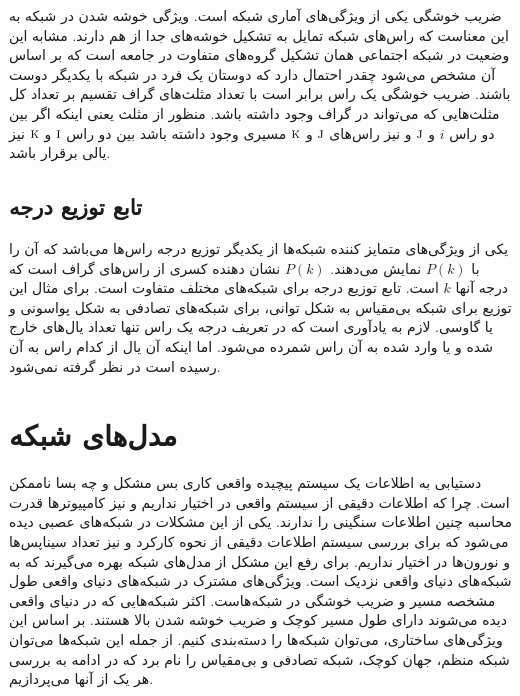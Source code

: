  
ضریب خوشگی یکی از ویژگی‌های آماری شبکه است. ویژگی خوشه شدن در شبکه به این معناست که راس‌های شبکه تمایل به تشکیل خوشه‌های جدا از هم دارند. مشابه این وضعیت در شبکه اجتماعی همان تشکیل گروه‌های متفاوت در جامعه است که بر اساس آن مشخص می‌شود چقدر احتمال دارد که دوستان یک فرد در شبکه با یکدیگر دوست باشند. ضریب خوشگی یک راس برابر است با تعداد مثلث‌های گراف تقسیم بر تعداد کل مثلث‌هایی که می‌تواند در گراف وجود داشته باشد. منظور از مثلث یعنی اینکه اگر بین دو راس $i$ و $\textsc{j}$ و نیز راس‌های $\textsc{j}$ و $\textsc{k}$ مسیری وجود داشته باشد بین دو راس $\textsc{i}$ و $\textsc{k}$ نیز یالی برقرار باشد.
\subsection{تابع توزیع درجه}
یکی از ویژگی‌های  متمایز کننده شبکه‌ها از یکدیگر توزیع درجه‌ راس‌ها می‌باشد که آن را با $P(k)$ نمایش می‌دهند. $P(k)$ نشان دهنده کسری از راس‌های گراف است که درجه آنها $k$ است. تابع توزیع درجه برای شبکه‌های مختلف متفاوت است. برای مثال این توزیع برای شبکه بی‌مقیاس به شکل توانی، برای شبکه‌های تصادفی به شکل پواسونی و یا گاوسی.
لازم به  یادآوری است که در تعریف درجه یک راس تنها تعداد یال‌های خارج شده و یا وارد شده به آن راس شمرده می‌شود. اما اینکه آن یال از کدام راس به آن رسیده است در نظر گرفته نمی‌شود. 
\section{مدل‌های شبکه}  
دستیابی به اطلاعات یک سیستم پیچیده واقعی کاری بس مشکل و چه بسا ناممکن است. چرا که  اطلاعات دقیقی از سیستم واقعی در اختیار نداریم و نیز کامپیوتر‌ها قدرت محاسبه چنین اطلاعات سنگینی را ندارند. یکی از این مشکلات در شبکه‌های عصبی دیده می‌شود که برای بررسی سیستم اطلاعات دقیقی از نحوه کارکرد و نیز تعداد سیناپس‌ها و نورون‌ها در اختیار نداریم. برای رفع این مشکل از مدل‌های شبکه بهره می‌گیرند که به شبکه‌های دنیای واقعی نزدیک است.  ویژگی‌های مشترک در شبکه‌های دنیای واقعی طول مشخصه مسیر و ضریب خوشگی  در شبکه‌هاست. اکثر شبکه‌هایی که در دنیای واقعی دیده می‌شوند دارای طول مسیر کوچک و ضریب خوشه شدن بالا هستند. بر اساس این ویژگی‌های ساختاری، می‌توان شبکه‌ها را دسته‌بندی‌ کنیم. از جمله این شبکه‌ها می‌توان   شبکه منظم، جهان کوچک، شبکه تصادفی و بی‌مقیاس را نام برد که در ادامه به بررسی هر یک از آنها می‌پردازیم.
